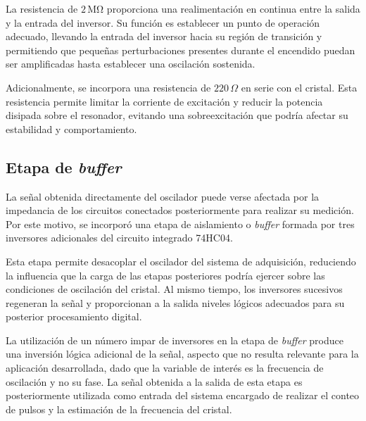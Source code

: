 \documentclass{article}
\begin{document}
La resistencia de $2\,\mathrm{M\Omega}$ proporciona una realimentación en continua entre la salida y la entrada del inversor. Su función es establecer un punto de operación adecuado, llevando la entrada del inversor hacia su región de transición y permitiendo que pequeñas perturbaciones presentes durante el encendido puedan ser amplificadas hasta establecer una oscilación sostenida.

Adicionalmente, se incorpora una resistencia de $220\,\Omega$ en serie con el cristal. Esta resistencia permite limitar la corriente de excitación y reducir la potencia disipada sobre el resonador, evitando una sobreexcitación que podría afectar su estabilidad y comportamiento.

\subsection{Etapa de \textit{buffer}}
\label{subsec:buffer}

La señal obtenida directamente del oscilador puede verse afectada por la impedancia de los circuitos conectados posteriormente para realizar su medición. Por este motivo, se incorporó una etapa de aislamiento o \textit{buffer} formada por tres inversores adicionales del circuito integrado 74HC04.

Esta etapa permite desacoplar el oscilador del sistema de adquisición, reduciendo la influencia que la carga de las etapas posteriores podría ejercer sobre las condiciones de oscilación del cristal. Al mismo tiempo, los inversores sucesivos regeneran la señal y proporcionan a la salida niveles lógicos adecuados para su posterior procesamiento digital.

La utilización de un número impar de inversores en la etapa de \textit{buffer} produce una inversión lógica adicional de la señal, aspecto que no resulta relevante para la aplicación desarrollada, dado que la variable de interés es la frecuencia de oscilación y no su fase. La señal obtenida a la salida de esta etapa es posteriormente utilizada como entrada del sistema encargado de realizar el conteo de pulsos y la estimación de la frecuencia del cristal.
\end{document}
